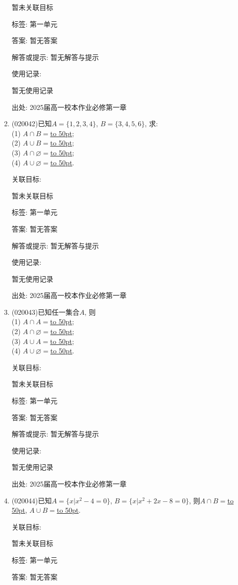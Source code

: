 \documentclass[10pt,a4paper]{article}
\newcommand{\blank}[1]{\underline{\hbox to #1pt{}}}
\begin{document}
\begin{enumerate}[1.]
暂未关联目标



标签: 第一单元

答案: 暂无答案

解答或提示: 暂无解答与提示

使用记录:

暂无使用记录


出处: 2025届高一校本作业必修第一章
\item { (020042)}已知$A=\{1, 2, 3, 4\}$, $B=\{3, 4, 5, 6\}$, 求:\\
(1) $A\cap B=$\blank{50};\\
(2) $A\cup B=$\blank{50};\\
(3) $A\cap\varnothing=$\blank{50};\\
(4) $A\cup\varnothing=$\blank{50}.


关联目标:

暂未关联目标



标签: 第一单元

答案: 暂无答案

解答或提示: 暂无解答与提示

使用记录:

暂无使用记录


出处: 2025届高一校本作业必修第一章
\item { (020043)}已知任一集合$A$, 则\\
(1) $A\cap A=$\blank{50};\\
(2) $A\cap\varnothing=$\blank{50};\\
(3) $A\cup A=$\blank{50};\\
(4) $A\cup\varnothing=$\blank{50}.


关联目标:

暂未关联目标



标签: 第一单元

答案: 暂无答案

解答或提示: 暂无解答与提示

使用记录:

暂无使用记录


出处: 2025届高一校本作业必修第一章
\item { (020044)}已知$A=\{x|x^2-4=0\}$, $B=\{x|x^2+2x-8=0\}$, 则$A\cap B=$\blank{50}, $A\cup B=$\blank{50}.


关联目标:

暂未关联目标



标签: 第一单元

答案: 暂无答案


\end{enumerate}
\end{document}
